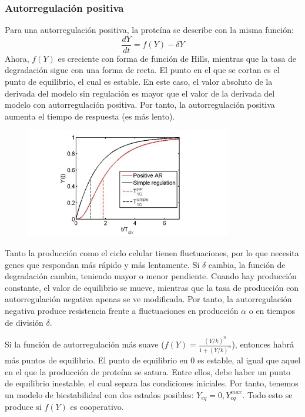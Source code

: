 \subsubsection{Autorregulación positiva}
Para una autorregulación positiva, la proteína se describe con la misma función:
$$\frac{dY}{dt} = f(Y) - \delta Y$$
Ahora, $f(Y)$ es creciente con forma de función de Hills, mientras que la tasa de degradación sigue con una forma de recta. El punto en el que se cortan es el punto de equilibrio, el cual es estable. En este caso, el valor absoluto de la derivada del modelo sin regulación es mayor que el valor de la derivada del modelo con autorregulación positiva. Por tanto, la autorregulación positiva aumenta el tiempo de respuesta (es más lento). 
\begin{figure}[h]
\centering
\includegraphics[width = 0.8\textwidth]{figs/par.png}
\end{figure}

Tanto la producción como el ciclo celular tienen fluctuaciones, por lo que necesita genes que respondan más rápido y más lentamente. Si $\delta$ cambia, la función de degradación cambia, teniendo mayor o menor pendiente. Cuando hay producción constante, el valor de equilibrio se mueve, mientras que la tasa de producción con autorregulación negativa apenas se ve modificada. Por tanto, la autorregulación negativa produce resistencia frente a fluctuaciones en producción $\alpha$ o en tiempos de división $\delta$. 

Si la función de autorregulación más suave ($f(Y) = \frac{(Y/k)^n}{1 + (Y/k)^n}$), entonces habrá más puntos de equilibrio. El punto de equilibrio en 0 es estable, al igual que aquel en el que la producción de proteína se satura. Entre ellos, debe haber un punto de equilibrio inestable, el cual separa las condiciones iniciales. Por tanto, tenemos un modelo de biestabilidad con dos estados posibles: $Y_{eq} = 0, Y_{eq}^{max}$. Todo esto se produce si $f(Y)$ es cooperativo. 

